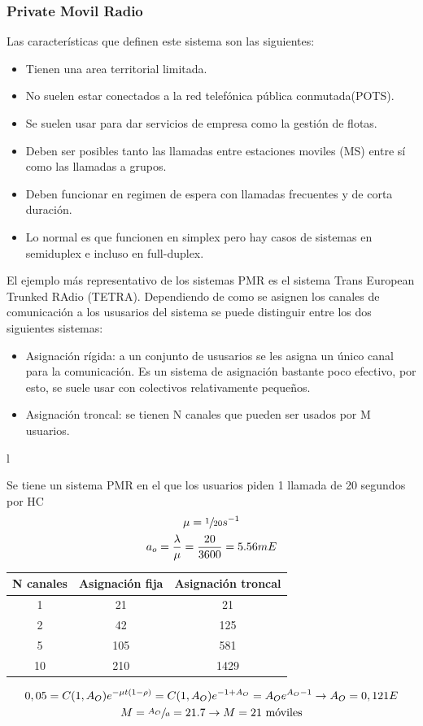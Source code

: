 \subsubsection{Private Movil Radio}
\label{ssub:PMR}
Las características que definen este sistema son las siguientes:
\begin{itemize}
	\item Tienen una area territorial limitada.
	\item No suelen estar conectados a la red telefónica pública conmutada(POTS).
	\item Se suelen usar para dar servicios de empresa como la gestión de flotas.
	\item Deben ser posibles tanto las llamadas entre estaciones moviles (MS) entre sí como las llamadas a grupos.
	\item Deben funcionar en regimen de espera con llamadas frecuentes y de corta duración.
	\item Lo normal es que funcionen en simplex pero hay casos de sistemas en semiduplex e incluso en full-duplex.
\end{itemize}
El ejemplo más representativo de los sistemas PMR es el sistema Trans European Trunked RAdio (TETRA). Dependiendo de como se asignen los canales de comunicación a los ususarios del sistema se puede distinguir entre los dos siguientes sistemas:
\begin{itemize}
	\item Asignación rígida: a un conjunto de ususarios se les asigna un único canal para la comunicación. Es un sistema de asignación bastante poco efectivo, por esto, se suele usar con colectivos relativamente pequeños.
	\item Asignación troncal: se tienen N canales que pueden ser usados por M usuarios.
\end{itemize}
l
\begin{example}
Se tiene un sistema PMR en el que los usuarios piden 1 llamada de 20 segundos por HC
\begin{gather*}
	\mu=\sfrac{1}{20}s^{-1}\\
	a_o=\frac{\lambda}{\mu}=\frac{20}{3600}=5.56mE	
\end{gather*}
\begin{center}
\begin{tabular}{|c|c|c|}
\hline
	N canales 	& Asignación fija 	& Asignación troncal \\\hline
	1 			& 21 				& 21 \\\hline
	2 			& 42 				& 125 \\\hline
	5 			& 105 				& 581 \\\hline
	10 			& 210 				& 1429 \\\hline
\end{tabular}
\end{center}
\begin{gather*}
0,05=C(1,A_O)e^{-\mu t(1-\rho)}=C(1,A_O)e^{-1+A_O}=A_Oe^{A_O-1} \to A_O=0,121E\\
M=\sfrac{A_O}{a}=21.7\to M=21\text{ móviles}
\end{gather*}
\end{example}
